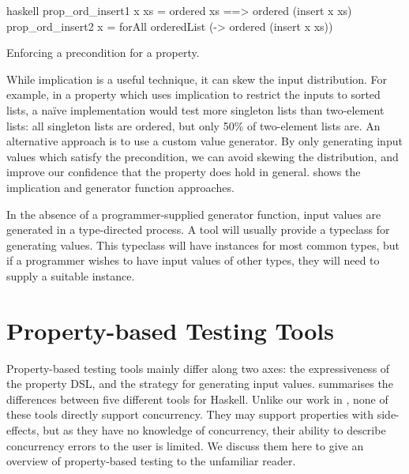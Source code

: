 \begin{listing}
\centering
\begin{cminted}{haskell}
prop_ord_insert1 x xs = ordered xs ==> ordered (insert x xs)
prop_ord_insert2 x    = forAll orderedList (\xs -> ordered (insert x xs))
\end{cminted}
\caption{Enforcing a precondition for a property.}\label{lst:prop_ord_insert}
\end{listing}

While implication is a useful technique, it can skew the input
distribution.  For example, in a property which uses implication to
restrict the inputs to sorted lists, a na\"ive implementation would
test more singleton lists than two-element lists: all singleton lists
are ordered, but only 50\% of two-element lists are.  An alternative
approach is to use a custom value generator.  By only generating input
values which satisfy the precondition, we can avoid skewing the
distribution, and improve our confidence that the property does hold
in general.   shows the implication and
generator function approaches.

In the absence of a programmer-supplied generator function, input
values are generated in a type-directed process.  A tool will usually
provide a typeclass for generating values.  This typeclass will have
instances for most common types, but if a programmer wishes to have
input values of other types, they will need to supply a suitable
instance.

\section{Property-based Testing Tools}
\label{sec:property_testing-tools}

Property-based testing tools mainly differ along two axes: the
expressiveness of the property DSL, and the strategy for generating
input values.   summarises the differences between
five different tools for Haskell.  Unlike our work in ,
none of these tools directly support concurrency.  They may support
properties with side-effects, but as they have no knowledge of
concurrency, their ability to describe concurrency errors to the user
is limited.  We discuss them here to give an overview of
property-based testing to the unfamiliar reader.

\begingroup
\newcommand{\YY}{\CIRCLE}
\newcommand{\NN}{\Circle}
\newcommand{\YN}{\LEFTcircle}
\newcommand{\QQ}{\NN$^p$}

